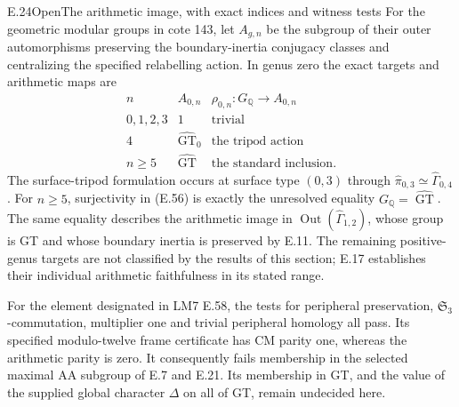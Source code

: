 \begin{result}{E.24}{Open}{The arithmetic image, with exact indices and witness tests}
For the geometric modular groups in cote 143, let
$A_{g,n}$ be the subgroup of their outer automorphisms
preserving the boundary-inertia conjugacy classes and
centralizing the specified relabelling action.  In genus
zero the exact targets and arithmetic maps are
\[
\begin{array}{c|c|c}
 n& A_{0,n}&\rho_{0,n}:G_{\mathbb Q}\longrightarrow A_{0,n}\\\hline
 0,1,2,3&1&\text{trivial}\\
 4&\widehat{\operatorname{GT}}_0&\text{the tripod action}\\
 n\geq5&\widehat{\operatorname{GT}}&\text{the standard inclusion}.
\end{array}                                                     \tag{E.56}
\]
The surface-tripod formulation occurs at surface type
$(0,3)$ through
$\widehat\pi_{0,3}\simeq\widehat\Gamma_{0,4}$.
For $n\geq5$, surjectivity in (E.56) is exactly the
unresolved equality $G_{\mathbb Q}=\widehat{\operatorname{GT}}$.
The same equality describes the arithmetic image in
$\operatorname{Out}(\widehat\Gamma_{1,2})$, whose group
is GT and whose boundary inertia is preserved by E.11.
The remaining positive-genus targets are not classified
by the results of this section; E.17 establishes their
individual arithmetic faithfulness in its stated range.

For the element designated in LM7 E.58, the tests for
peripheral preservation, $\mathfrak S_3$-commutation,
multiplier one and trivial peripheral homology all pass.
Its specified modulo-twelve frame certificate has CM
parity one, whereas the arithmetic parity is zero.
It consequently fails membership in the selected maximal
AA subgroup of E.7 and E.21.  Its membership in GT,
and the value of the supplied global character $\Delta$
on all of GT, remain undecided here.
\end{result}
